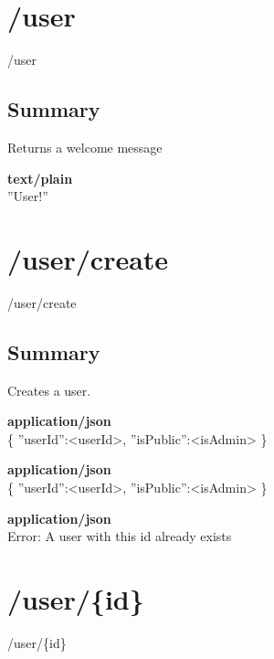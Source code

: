 \documentclass[11pt,fleqn,openany]{book} %
\begin{document}
\section{/user}
\begin{get}
/user
\end{get}

\subsection*{Summary}
Returns a welcome message
\begin{parameter}
\end{parameter}
\begin{return}[SUCCESS]
\textbf{text/plain}\\
''User!''
\end{return}

\section{/user/create}
\begin{post}
/user/create
\end{post}

\subsection*{Summary}
Creates a user.
\begin{parameter}
\textbf{application/json}\\
\{ ''userId'':<userId>, ''isPublic'':<isAdmin> \}
\end{parameter}
\begin{return}[CREATED]
\textbf{application/json}\\
\{ ''userId'':<userId>, ''isPublic'':<isAdmin> \}
\end{return}
\begin{return}[CONFLICT]
\textbf{application/json}\\
Error: A user with this id already exists
\end{return}

\section{/user/\{id\}}
\begin{get}
/user/\{id\}
\end{get}
\end{document}
